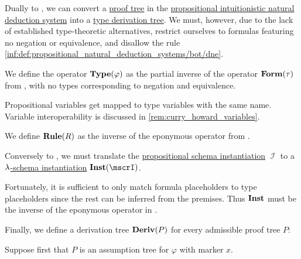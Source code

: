 \begin{algorithm}\label{alg:proof_tree_to_type_derivation}
  Dually to , we can convert a \hyperref[def:natural_deduction_proof_tree]{proof tree} in the \hyperref[def:propositional_natural_deduction_systems]{propositional intuitionistic natural deduction system} into a \hyperref[def:type_derivation_tree]{type derivation tree}. We must, however, due to the lack of established type-theoretic alternatives, restrict ourselves to formulas featuring no negation or equivalence, and disallow the rule \ref{inf:def:propositional_natural_deduction_systems/bot/dne}.

  \begin{thmenum}
     We define the operator \( \op*{Type}(\varphi) \) as the partial inverse of the operator \( \op*{Form}(\tau) \) from , with no types corresponding to negation and equivalence.

    Propositional variables get mapped to type variables with the same name. Variable interoperability is discussed in \cref{rem:curry_howard_variables}.

     We define \( \op*{Rule}(R) \) as the inverse of the eponymous operator from .

     Conversely to , we must translate the \hyperref[def:propositional_schema_instantiation]{propositional schema instantiation} \( \mscrI \) to a \hyperref[def:lambda_schema_instantiation]{\( {\mathrm \lambda} \)-schema instantiation} \( \op*{Inst}(\mscrI) \).

    Fortunately, it is sufficient to only match formula placeholders to type placeholders since the rest can be inferred from the premises. Thus \( \op*{Inst} \) must be the inverse of the eponymous operator in .

     Finally, we define a derivation tree \( \op*{Deriv}(P) \) for every admissible proof tree \( P \):
    \begin{thmenum}
       Suppose first that \( P \) is an assumption tree for \( \varphi \) with marker \( x \).


\end{thmenum}
\end{thmenum}
\end{algorithm}
